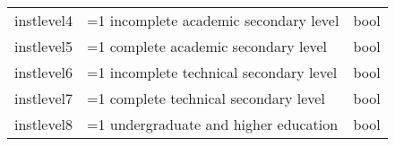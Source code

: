 \documentclass[11pt]{article}
\begin{document}
\begin{longtable}[]{@{}lll@{}}
\begin{minipage}[t]{0.19\columnwidth}
instlevel4\strut
\end{minipage} & \begin{minipage}[t]{0.16\columnwidth}\raggedright\strut
=1 incomplete academic secondary level\strut
\end{minipage} & \begin{minipage}[t]{0.24\columnwidth}\raggedright\strut
bool\strut
\end{minipage}\tabularnewline
\begin{minipage}[t]{0.19\columnwidth}\raggedright\strut
instlevel5\strut
\end{minipage} & \begin{minipage}[t]{0.16\columnwidth}\raggedright\strut
=1 complete academic secondary level\strut
\end{minipage} & \begin{minipage}[t]{0.24\columnwidth}\raggedright\strut
bool\strut
\end{minipage}\tabularnewline
\begin{minipage}[t]{0.19\columnwidth}\raggedright\strut
instlevel6\strut
\end{minipage} & \begin{minipage}[t]{0.16\columnwidth}\raggedright\strut
=1 incomplete technical secondary level\strut
\end{minipage} & \begin{minipage}[t]{0.24\columnwidth}\raggedright\strut
bool\strut
\end{minipage}\tabularnewline
\begin{minipage}[t]{0.19\columnwidth}\raggedright\strut
instlevel7\strut
\end{minipage} & \begin{minipage}[t]{0.16\columnwidth}\raggedright\strut
=1 complete technical secondary level\strut
\end{minipage} & \begin{minipage}[t]{0.24\columnwidth}\raggedright\strut
bool\strut
\end{minipage}\tabularnewline
\begin{minipage}[t]{0.19\columnwidth}\raggedright\strut
instlevel8\strut
\end{minipage} & \begin{minipage}[t]{0.16\columnwidth}\raggedright\strut
=1 undergraduate and higher education\strut
\end{minipage} & \begin{minipage}[t]{0.24\columnwidth}\raggedright\strut
bool\strut
\end{minipage}\tabularnewline

\end{longtable}
\end{document}
